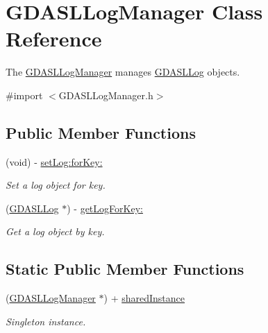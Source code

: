 \hypertarget{interface_g_d_a_s_l_log_manager}{
\section{GDASLLogManager Class Reference}
\label{interface_g_d_a_s_l_log_manager}
}


The \hyperlink{interface_g_d_a_s_l_log_manager}{GDASLLogManager} manages \hyperlink{interface_g_d_a_s_l_log}{GDASLLog} objects.  


{\ttfamily \#import $<$GDASLLogManager.h$>$}\subsection*{Public Member Functions}
\begin{DoxyCompactItemize}
\item 
(void) -\/ \hyperlink{interface_g_d_a_s_l_log_manager_a8c4c1b87584a9091f02c263ef2396937}{setLog:forKey:}
\begin{DoxyCompactList}\small\item\em Set a log object for key. \item\end{DoxyCompactList}\item 
(\hyperlink{interface_g_d_a_s_l_log}{GDASLLog} $\ast$) -\/ \hyperlink{interface_g_d_a_s_l_log_manager_ab8b36b60188da8c5faa9bfaccbeeafae}{getLogForKey:}
\begin{DoxyCompactList}\small\item\em Get a log object by key. \item\end{DoxyCompactList}\end{DoxyCompactItemize}
\subsection*{Static Public Member Functions}
\begin{DoxyCompactItemize}
\item 
\hypertarget{interface_g_d_a_s_l_log_manager_a915d6653d37a1494c519eccdcd605e9b}{
(\hyperlink{interface_g_d_a_s_l_log_manager}{GDASLLogManager} $\ast$) + \hyperlink{interface_g_d_a_s_l_log_manager_a915d6653d37a1494c519eccdcd605e9b}{sharedInstance}}
\label{interface_g_d_a_s_l_log_manager_a915d6653d37a1494c519eccdcd605e9b}

\begin{DoxyCompactList}\small\item\em Singleton instance. \item\end{DoxyCompactList}\end{DoxyCompactItemize}
